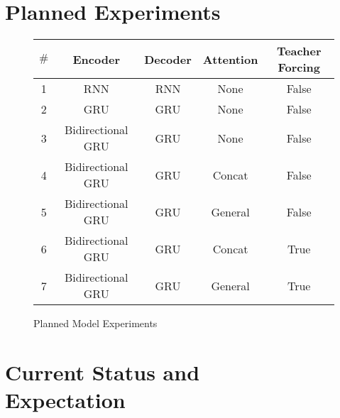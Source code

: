 \documentclass[twoside,twocolumn]{article}
\begin{document}
\section{Planned Experiments}
\begin{figure*}[ht]
    \centering
    \begin{tabular}{ |c|c|c|c|c| }
        \hline
        $\#$
          & \textbf{Encoder}
          & \textbf{Decoder}
          & \textbf{Attention}
          & \textbf{Teacher Forcing}\\
        \hline
        1 & RNN & RNN & None & False \\ \hline
        2 & GRU & GRU & None & False \\ \hline
        3 & Bidirectional GRU & GRU & None & False \\ \hline
        4 & Bidirectional GRU & GRU & Concat & False \\ \hline
        5 & Bidirectional GRU & GRU & General & False \\ \hline
        6 & Bidirectional GRU & GRU & Concat & True \\ \hline
        7 & Bidirectional GRU & GRU & General & True \\ \hline
    \end{tabular}

    \caption{Planned Model Experiments}
    \label{fig:model-experiments}
\end{figure*}


\section{Current Status and\\Expectation}




\end{document}
